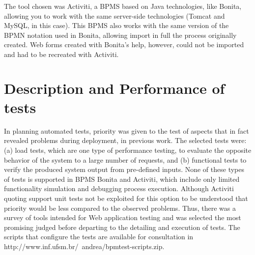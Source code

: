 \documentclass[runningheads,a4paper]{llncs}
\begin{document}
{%
The tool chosen was Activiti, a BPMS based on Java technologies, like Bonita, allowing you to work with the same server-side technologies (Tomcat and MySQL, in this case). This BPMS also works with the same version of the BPMN notation used in Bonita, allowing import in full the process originally created. Web forms created with Bonita's help, however, could not be imported and had to be recreated with Activiti.

\section{Description and Performance of tests}\label{s:testes}

In planning automated tests, priority was given to the test of aspects that in fact revealed problems during deployment, in previous work. The selected tests were: (a) load tests, which are one type of performance testing, to evaluate the opposite behavior of the system to a large number of requests, and (b) functional tests to verify the produced system output from pre-defined inputs. None of these types of tests is supported in BPMS Bonita and Activiti, which include only limited functionality simulation and debugging process execution. Although Activiti quoting support unit tests not be exploited for this option to be understood that priority would be less compared to the observed problems.
Thus, there was a survey of tools intended for Web application testing and was selected the most promising judged before departing to the detailing and execution of tests. The scripts that configure the tests are available for consultation in http://www.inf.ufsm.br/~andrea/bpmtest-scripts.zip.

}
\end{document}
